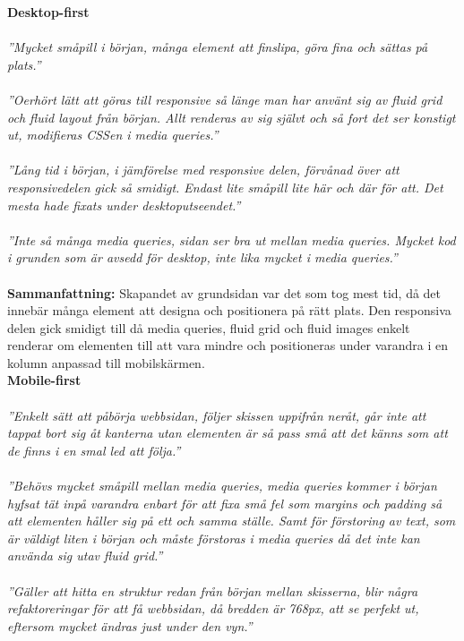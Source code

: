 \documentclass[11pt]{article}
\begin{document}
\textbf{Desktop-first}
\\\\
\textit{”Mycket småpill i början, många element att finslipa, göra fina och sättas på plats.”}\\\\
\textit{”Oerhört lätt att göras till responsive så länge man har använt sig av fluid grid och fluid layout från början. Allt renderas av sig självt och så fort det ser konstigt ut, modifieras CSSen i media queries.”}\\\\
\textit{”Lång tid i början, i jämförelse med responsive delen, förvånad över att responsivedelen gick så smidigt. Endast lite småpill lite här och där för att. Det mesta hade fixats under desktoputseendet.”}\\\\
\textit{”Inte så många media queries, sidan ser bra ut mellan media queries. Mycket kod i grunden som är avsedd för desktop, inte lika mycket i media queries.”}\\\\
\textbf{Sammanfattning:} Skapandet av grundsidan var det som tog mest tid, då det innebär många element att designa och positionera på rätt plats. Den responsiva delen gick smidigt till då media queries, fluid grid och fluid images enkelt renderar om elementen till att vara mindre och positioneras under varandra i en kolumn anpassad till mobilskärmen.
\vspace{0.735cm}
\\
\textbf{Mobile-first}
\\\\
\textit{”Enkelt sätt att påbörja webbsidan, följer skissen uppifrån neråt, går inte att tappat bort sig åt kanterna utan elementen är så pass små att det känns som att de finns i en smal led att följa.”}\\\\
\textit{”Behövs mycket småpill mellan media queries, media queries kommer i början hyfsat tät inpå varandra enbart för att fixa små fel som margins och padding så att elementen håller sig på ett och samma ställe. Samt för förstoring av text, som är väldigt liten i början och måste förstoras i media queries då det inte kan använda sig utav fluid grid.”}\\\\
\textit{”Gäller att hitta en struktur redan från början mellan skisserna, blir några refaktoreringar för att få webbsidan, då bredden är 768px, att se perfekt ut, eftersom mycket ändras just under den vyn.”}\\\\
\end{document}
